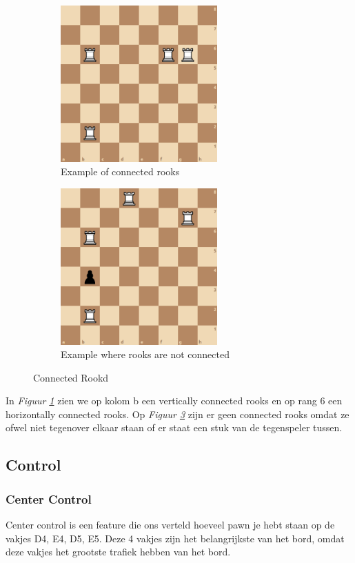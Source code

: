 \documentclass[a4paper,openany]{uantwerpenassignment}
\newcommand{\figref}[1]{\textit{Figuur \ref{#1}}}
\begin{document}
\begin{figure}[h]
    \centering
    \begin{subfigure}{.4\textwidth}
        \includegraphics[width=170pt]{images/ConnectedRooks.png}
        \caption{Example of connected rooks}
        \label{fig:ConnectedRooks}
    \end{subfigure}
    \begin{subfigure}{.4\textwidth}
        \includegraphics[width=170pt]{images/NotConnectedRooks.png}
        \caption{Example where rooks are not connected}
        \label{fig:NotConnectedRooks}
    \end{subfigure}
    \caption{Connected Rookd}
\end{figure}

In \figref{fig:ConnectedRooks} zien we op kolom b een vertically connected rooks en op rang 6 een horizontally connected rooks. Op \figref{fig:NotConnectedRooks} zijn er geen connected rooks omdat ze ofwel niet tegenover elkaar staan of er staat een stuk van de tegenspeler tussen.

\subsection{Control}
\subsubsection{Center Control}
Center control is een feature die ons verteld hoeveel pawn je hebt staan op de vakjes D4, E4, D5, E5. Deze 4 vakjes zijn het belangrijkste van het bord, omdat deze vakjes het grootste trafiek hebben van het bord.
\end{document}
